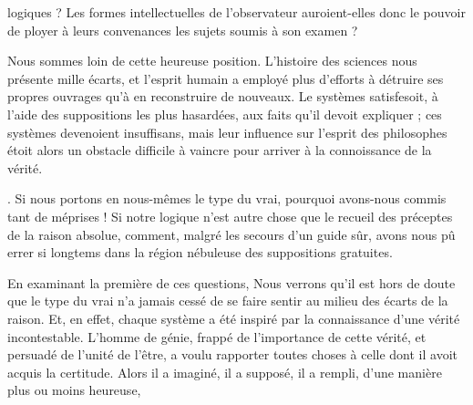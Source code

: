 \documentclass[11pt,a4paper]{article}
\begin{document}

logiques ? Les formes intellectuelles de l'observateur auroient-elles
donc le pouvoir de ployer à leurs convenances les sujets soumis à son
examen ?

Nous sommes loin de cette heureuse position. L'histoire des sciences
nous présente mille écarts, et l'esprit humain a employé plus d'efforts
à  détruire ses propres ouvrages qu'à en reconstruire
de nouveaux.  Le systèmes satisfesoit, à l'aide des
suppositions les plus hasardées, aux faits qu'il
devoit expliquer ;   ces systèmes
devenoient insuffisans, mais leur influence sur l'esprit des philosophes
étoit alors un obstacle  difficile à vaincre pour arriver à
la connoissance de la vérité.

 \ill{}. Si nous portons en nous-mêmes le type du vrai, pourquoi avons-nous
commis tant de méprises ! Si notre logique n'est autre chose que le
recueil des préceptes de la raison absolue, comment, 
malgré les secours d'un guide sûr, avons nous pû errer si longtems dans
la région nébuleuse des suppositions gratuites.

En examinant la première de ces questions, Nous verrons qu'il est hors
de doute que le type du vrai n'a jamais cessé de se faire sentir au
milieu des écarts de la raison. Et, en effet, chaque système a été
inspiré par la connaissance d'une vérité incontestable. L'homme de
génie, frappé de l'importance de cette vérité, et persuadé de l'unité
de l'être, a voulu rapporter toutes choses à celle dont il avoit acquis
la certitude. Alors il a imaginé, il a supposé, il a rempli, d'une
manière plus ou moins heureuse,
\end{document}
